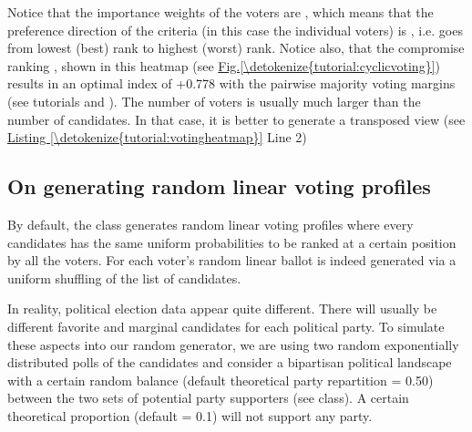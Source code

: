 \documentclass[a4paper,12pt,english]{sphinxhowto}
\begin{document}
Notice that the importance weights of the voters are , which means that the preference direction of the criteria (in this case the individual voters) is , i.e. goes from lowest (best) rank to highest (worst) rank. Notice also, that the compromise  ranking \sphinxstyleemphasis{{[}a4,a5,a2,a1,a3{]}}, shown in this heatmap (see \hyperref[\detokenize{tutorial:cyclicvoting}]{Fig.\@ \ref{\detokenize{tutorial:cyclicvoting}}}) results in an optimal  index of +0.778 with the pairwise majority voting margins (see tutorials  and {\hyperref[\detokenize{tutorial:ranking-tutorial-label}]{}}). The number of voters is usually much larger than the number of candidates. In that case, it is better to generate a transposed  view (see \hyperref[\detokenize{tutorial:votingheatmap}]{Listing \ref{\detokenize{tutorial:votingheatmap}}} Line 2)


\subsection{On generating random linear voting profiles}
\label{\detokenize{tutorial:on-generating-random-linear-voting-profiles}}
By default, the  class generates random linear voting profiles where every candidates has the same uniform probabilities to be ranked at a certain position by all the voters. For each voter’s random linear ballot is indeed generated  via a uniform shuffling of the list of candidates.

In reality, political election data appear quite different. There will usually be different favorite and marginal candidates for each political party. To simulate these aspects into our random generator, we are using two random exponentially distributed polls of the candidates and consider a bipartisan political landscape with a certain random balance (default theoretical party repartition = 0.50) between the two sets of potential party supporters (see  class). A certain theoretical proportion (default = 0.1) will not support any party.
\end{document}
